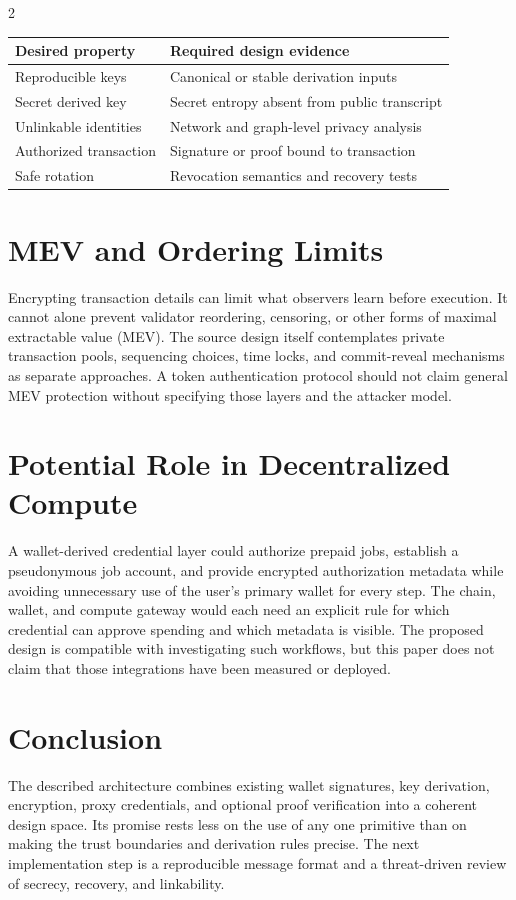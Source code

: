 \documentclass[10pt,letterpaper]{article}
\begin{document}
\begin{multicols}{2}
\begin{center}
\begin{minipage}{\columnwidth}
\centering\small
\begin{tabular}{p{}p{}}
\toprule
Desired property & Required design evidence\\
\midrule
Reproducible keys & Canonical or stable derivation inputs\\
Secret derived key & Secret entropy absent from public transcript\\
Unlinkable identities & Network and graph-level privacy analysis\\
Authorized transaction & Signature or proof bound to transaction\\
Safe rotation & Revocation semantics and recovery tests\\
\bottomrule
\end{tabular}
\end{minipage}
\end{center}

\section{MEV and Ordering Limits}
Encrypting transaction details can limit what observers learn before execution. It cannot alone prevent validator reordering, censoring, or other forms of maximal extractable value (MEV). The source design itself contemplates private transaction pools, sequencing choices, time locks, and commit-reveal mechanisms as separate approaches. A token authentication protocol should not claim general MEV protection without specifying those layers and the attacker model.

\section{Potential Role in Decentralized Compute}
A wallet-derived credential layer could authorize prepaid jobs, establish a pseudonymous job account, and provide encrypted authorization metadata while avoiding unnecessary use of the user's primary wallet for every step. The chain, wallet, and compute gateway would each need an explicit rule for which credential can approve spending and which metadata is visible. The proposed design is compatible with investigating such workflows, but this paper does not claim that those integrations have been measured or deployed.

\section{Conclusion}
The described architecture combines existing wallet signatures, key derivation, encryption, proxy credentials, and optional proof verification into a coherent design space. Its promise rests less on the use of any one primitive than on making the trust boundaries and derivation rules precise. The next implementation step is a reproducible message format and a threat-driven review of secrecy, recovery, and linkability.

\end{multicols}
\end{document}
